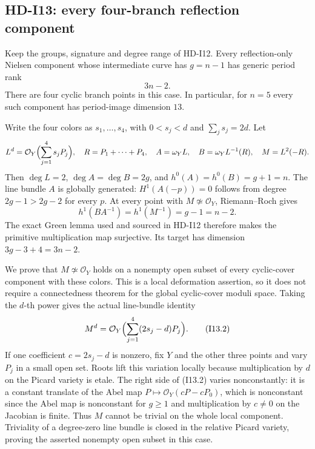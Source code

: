 \subsection{HD-I13: every four-branch reflection component}
\label{sec:HD-I13}

Keep the groups, signature and degree range of HD-I12.  Every
reflection-only Nielsen component whose intermediate curve has
$g=n-1$ has generic period rank
\begin{equation}
                         3n-2.                 \tag{I13.1}
\end{equation}
There are four cyclic branch points in this case.  In particular,
for $n=5$ every such component has period-image dimension $13$.

Write the four colors as $s_1,\ldots,s_4$, with
$0<s_j<d$ and $\sum_j s_j=2d$.  Let
\[
 L^d=\mathcal O_Y\Bigl(\sum_{j=1}^4s_jP_j\Bigr),\quad
 R=P_1+\cdots+P_4,\quad A=\omega_YL,\quad
 B=\omega_YL^{-1}(R),\quad M=L^2(-R).
\]
Then $\deg L=2$, $\deg A=\deg B=2g$, and
$h^0(A)=h^0(B)=g+1=n$.  The line bundle $A$ is globally generated:
$H^1(A(-p))=0$ follows from degree $2g-1>2g-2$ for every $p$.
At every point with $M\not\simeq\mathcal O_Y$, Riemann--Roch gives
\[
 h^1(BA^{-1})=h^1(M^{-1})=g-1=n-2.
\]
The exact Green lemma used and sourced in HD-I12 therefore makes
the primitive multiplication map surjective.  Its target has dimension
$3g-3+4=3n-2$.

We prove that $M\not\simeq\mathcal O_Y$ holds on a nonempty open subset
of every cyclic-cover component with these colors.  This is a local
deformation assertion, so it does not require a connectedness theorem
for the global cyclic-cover moduli space.  Taking the $d$-th power gives
the actual line-bundle identity
\begin{equation}
 M^d=\mathcal O_Y\Bigl(\sum_{j=1}^4(2s_j-d)P_j\Bigr).
                                                   \tag{I13.2}
\end{equation}
If one coefficient $c=2s_j-d$ is nonzero, fix $Y$ and the other three
points and vary $P_j$ in a small open set.  Roots lift this variation
locally because multiplication by $d$ on the Picard variety is etale.
The right side of (I13.2) varies nonconstantly: it is a constant translate
of the Abel map $P\mapsto\mathcal O_Y(cP-cP_0)$, which is nonconstant
since the Abel map is nonconstant for $g\geq1$ and multiplication by
$c\ne0$ on the Jacobian is finite.  Thus $M$ cannot be trivial on the
whole local component.  Triviality of a degree-zero line bundle is
closed in the relative Picard variety, proving the asserted nonempty
open subset in this case.

